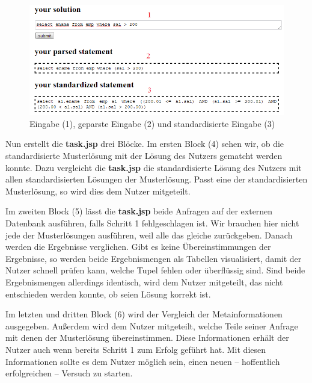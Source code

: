 \begin{figure}[h]
\centering
\includegraphics[scale=0.7]{Bilder/screen_prog1}
\caption{Eingabe (1), geparste Eingabe (2) und standardisierte Eingabe (3)}
\label{fig:screen_prog1}
\end{figure}

Nun erstellt die \textbf{task.jsp} drei Blöcke. Im ersten Block (4) sehen wir, ob die standardisierte Musterlösung mit der Lösung des Nutzers gematcht werden konnte. Dazu vergleicht die \textbf{task.jsp} die standardisierte Lösung des Nutzers mit allen standardisierten Lösungen der Musterlösung. Passt eine der standardisierten Musterlösung, so wird dies dem Nutzer mitgeteilt. 

Im zweiten Block (5) lässt die \textbf{task.jsp} beide Anfragen auf der externen Datenbank ausführen, falls Schritt 1 fehlgeschlagen ist. Wir brauchen hier nicht jede der Musterlösungen ausführen, weil alle das gleiche zurückgeben. Danach werden die Ergebnisse verglichen. Gibt es keine Übereinstimmungen der Ergebnisse, so werden beide Ergebnismengen als Tabellen visualisiert, damit der Nutzer schnell prüfen kann, welche Tupel fehlen oder überflüssig sind. Sind beide Ergebnismengen allerdings identisch, wird dem Nutzer mitgeteilt, das nicht entschieden werden konnte, ob seien Lösung korrekt ist.

Im letzten und dritten Block (6) wird der Vergleich der Metainformationen ausgegeben. Außerdem wird dem Nutzer mitgeteilt, welche Teile seiner Anfrage mit denen der Musterlösung übereinstimmen. Diese Informationen erhält der Nutzer auch wenn bereits Schritt 1 zum Erfolg geführt hat. Mit diesen Informationen sollte es dem Nutzer möglich sein, einen neuen -- hoffentlich erfolgreichen -- Versuch zu starten.

